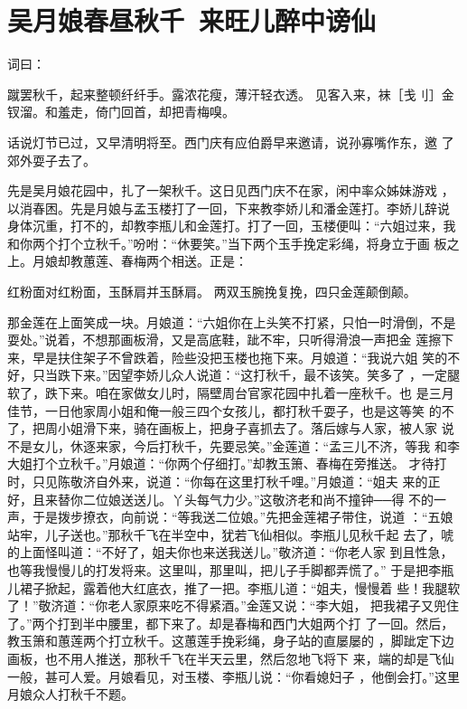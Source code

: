 \chapter{吴月娘春昼秋千~来旺儿醉中谤仙}

词曰：

蹴罢秋千，起来整顿纤纤手。露浓花瘦，薄汗轻衣透。
见客入来，袜［戋刂］金钗溜。和羞走，倚门回首，却把青梅嗅。

话说灯节已过，又早清明将至。西门庆有应伯爵早来邀请，说孙寡嘴作东，邀
了郊外耍子去了。

先是吴月娘花园中，扎了一架秋千。这日见西门庆不在家，闲中率众姊妹游戏
，以消春困。先是月娘与孟玉楼打了一回，下来教李娇儿和潘金莲打。李娇儿辞说
身体沉重，打不的，却教李瓶儿和金莲打。打了一回，玉楼便叫：“六姐过来，我
和你两个打个立秋千。”吩咐：“休要笑。”当下两个玉手挽定彩绳，将身立于画
板之上。月娘却教蕙莲、春梅两个相送。正是：

红粉面对红粉面，玉酥肩并玉酥肩。
两双玉腕挽复挽，四只金莲颠倒颠。

那金莲在上面笑成一块。月娘道：“六姐你在上头笑不打紧，只怕一时滑倒，不是
耍处。”说着，不想那画板滑，又是高底鞋，跐不牢，只听得滑浪一声把金
莲擦下来，早是扶住架子不曾跌着，险些没把玉楼也拖下来。月娘道：“我说六姐
笑的不好，只当跌下来。”因望李娇儿众人说道：“这打秋千，最不该笑。笑多了
，一定腿软了，跌下来。咱在家做女儿时，隔壁周台官家花园中扎着一座秋千。也
是三月佳节，一日他家周小姐和俺一般三四个女孩儿，都打秋千耍子，也是这等笑
的不了，把周小姐滑下来，骑在画板上，把身子喜抓去了。落后嫁与人家，被人家
说不是女儿，休逐来家，今后打秋千，先要忌笑。”金莲道：“孟三儿不济，等我
和李大姐打个立秋千。”月娘道：“你两个仔细打。”却教玉箫、春梅在旁推送。
才待打时，只见陈敬济自外来，说道：“你每在这里打秋千哩。”月娘道：“姐夫
来的正好，且来替你二位娘送送儿。丫头每气力少。”这敬济老和尚不撞钟──得
不的一声，于是拨步撩衣，向前说：“等我送二位娘。”先把金莲裙子带住，说道
：“五娘站牢，儿子送也。”那秋千飞在半空中，犹若飞仙相似。李瓶儿见秋千起
去了，唬的上面怪叫道：“不好了，姐夫你也来送我送儿。”敬济道：“你老人家
到且性急，也等我慢慢儿的打发将来。这里叫，那里叫，把儿子手脚都弄慌了。”
于是把李瓶儿裙子掀起，露着他大红底衣，推了一把。李瓶儿道：“姐夫，慢慢着
些！我腿软了！”敬济道：“你老人家原来吃不得紧酒。”金莲又说：“李大姐，
把我裙子又兜住了。”两个打到半中腰里，都下来了。却是春梅和西门大姐两个打
了一回。然后，教玉箫和蕙莲两个打立秋千。这蕙莲手挽彩绳，身子站的直屡屡的
，脚跐定下边画板，也不用人推送，那秋千飞在半天云里，然后忽地飞将下
来，端的却是飞仙一般，甚可人爱。月娘看见，对玉楼、李瓶儿说：“你看媳妇子
，他倒会打。”这里月娘众人打秋千不题。

